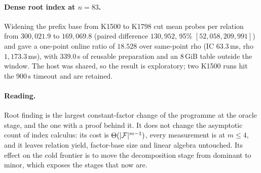 \paragraph{Dense root index at $n=83$.} Widening the prefix base from
K1500 to K1798 cut mean probes per relation from $300{,}021.9$ to
$169{,}069.8$ (paired difference $130{,}952$, 95\% $[52{,}058,209{,}991]$)
and gave a one-point online ratio of $18.528$ over same-point rho (IC
$63.3$\,ms, rho $1{,}173.3$\,ms), with $339.0$\,s of reusable preparation
and an 8\,GiB table outside the window. The host was shared, so the result
is exploratory; two K1500 runs hit the 900\,s timeout and are retained.

\paragraph{Reading.} Root finding is the largest constant-factor change
of the programme at the oracle stage, and the one with a proof behind it.
It does not change the asymptotic count of index calculus: its cost is
$\Theta(\lvert \mathcal{F} \rvert^{m-1})$, every measurement is at $m\le4$, and it leaves
relation yield, factor-base size and linear algebra untouched. Its effect
on the cold frontier is to move the decomposition stage from dominant to
minor, which exposes the stages that now are.
